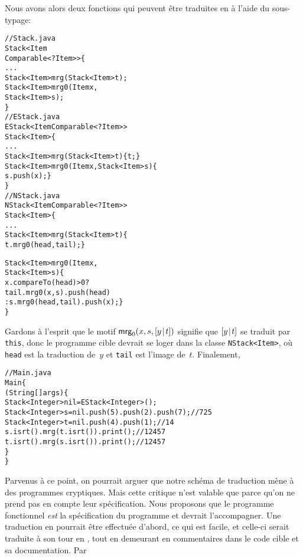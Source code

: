 Nous avons alors deux fonctions qui peuvent être traduites en \Java à
l'aide du sous-typage:
\begin{alltt}
// Stack.java
\public \abstractX \class Stack<Item
\hfill\extends Comparable<? \super Item>> \{
  ...
  \public \abstractX Stack<Item> mrg(\final Stack<Item> t);
  \public \abstractX Stack<Item> mrg0(\final Item x,
                                   \final Stack<Item> s);
\}
// EStack.java
\public \class EStack<Item \extends Comparable<? \super Item>>
       \extends Stack<Item> \{
  ...
  \public Stack<Item> mrg(\final Stack<Item> t) \{ \return t; \}
  \public Stack<Item> mrg0(\final\! Item x,\final Stack<Item> s)\{
    \return s.push(x); \}
\}
// NStack.java
\public \class NStack<Item \extends Comparable<? \super Item>>
       \extends Stack<Item> \{
  ...
  \public Stack<Item> mrg(\final Stack<Item> t) \{
    \return t.mrg0(head,tail); \}

  \public Stack<Item> mrg0(\final Item x,
                          \final Stack<Item> s) \{
    \return x.compareTo(head) > 0 ?
           tail.mrg0(x,s).push(head)
         : s.mrg0(head,tail).push(x); \}
\}
\end{alltt}
Gardons à l'esprit que le motif \(\textsf{mrg}_0(x,s,[{y}\!\mid\!{t}])\)
signifie que \([{y}\!\mid\!{t}]\) se traduit par \texttt{this}, donc le
programme cible devrait se loger dans la classe \texttt{NStack<Item>},
où \texttt{head} est la traduction de~\(y\) et \texttt{tail} est
l'image de~\(t\). Finalement,
\begin{alltt}
// Main.java
\public \class Main \{
  \public \static \void \main (String[] args) \{
    Stack<Integer> nil = \new EStack<Integer>();
    Stack<Integer> s = nil.push(5).push(2).push(7);\hfill// 7 2 5
    Stack<Integer> t = nil.push(4).push(1);\hfill// 1 4
    s.isrt().mrg(t.isrt()).print();\hfill// 1 2 4 5 7
    t.isrt().mrg(s.isrt()).print();\hfill// 1 2 4 5 7
  \}
\}
\end{alltt}
Parvenus à ce point, on pourrait arguer que notre schéma de traduction
mène à des programmes \Java cryptiques. Mais cette critique n'est
valable que parce qu'on ne prend pas en compte leur
spécification. Nous proposons que le programme fonctionnel \emph{est}
la spécification du programme \Java et devrait l'accompagner. Une
traduction en \Erlang pourrait être effectuée d'abord, ce qui est
facile, et celle-ci serait traduite à son tour en \Java, tout en
demeurant en commentaires dans le code cible et sa documentation. Par
